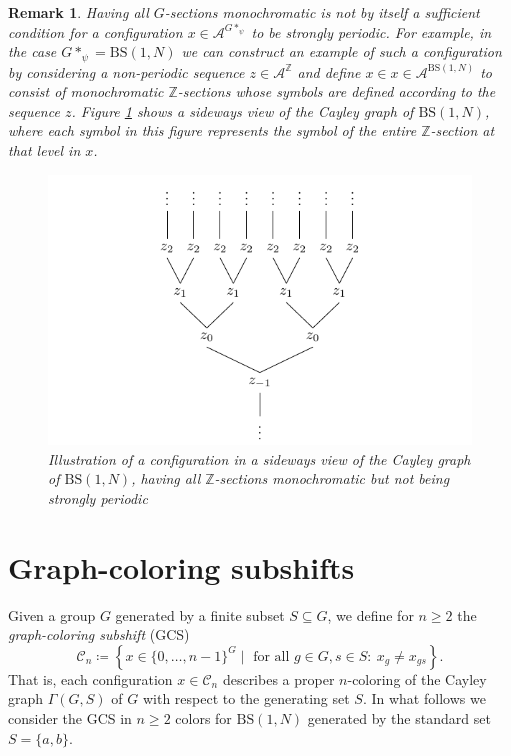\documentclass[cupthm,crop,info]{CUP-JNL-ETS}%
\theoremstyle{cupplain}
\theoremstyle{cupdefinition}
\theoremstyle{cupremark}
\newtheorem{remark}[theorem]{Remark}
\theoremstyle{cupproof}
\numberwithin{equation}{section}
\newcommand{\BS}[1][N]{\mathrm{BS}(1,#1)}
\begin{document}
\begin{remark} Having all $G$-sections monochromatic is not by itself a sufficient condition for a configuration $x\in \mathcal{A}^{G*_{\psi}}$ to be strongly periodic. For example, in the case $G*_{\psi}=\BS$ we can construct an example of such a configuration by considering a non-periodic sequence $z\in \mathcal{A}^\mathbb{Z}$ and define $x\in x\in \mathcal{A}^{\BS}$ to consist of monochromatic $\mathbb{Z}$-sections whose symbols are defined according to the sequence $z$. Figure \ref{fig:monochromatic_rows_tree_counterexample} shows a sideways view of the Cayley graph of $\BS$, where each symbol in this figure represents the symbol of the entire $\mathbb{Z}$-section at that level in $x$.
	\begin{figure}
		\centering
\includegraphics{tree_aperiodic.pdf}
		\caption{Illustration of a configuration in a sideways view of the Cayley graph of $\BS$, having all $\mathbb{Z}$-sections monochromatic but not being strongly periodic}
		\label{fig:monochromatic_rows_tree_counterexample}
	\end{figure}
\end{remark}



\section{Graph-coloring subshifts}\label{section:graph_coloring_subshifts}
Given a group $G$ generated by a finite subset $S\subseteq G$, we define for $n\ge 2$ the \textit{graph-coloring subshift} (GCS)
$$
\mathcal{C}_{n}\coloneqq\left\{x\in \{0,\ldots,n-1\}^G\mid \text{ for all } g\in G, s\in S: \ x_{g}\neq x_{gs} \right\}.
$$
That is, each configuration $x\in \mathcal{C}_{n}$ describes a proper $n$-coloring of the Cayley graph $\Gamma(G,S)$ of $G$ with respect to the generating set $S$. In what follows we consider the GCS in $n\ge 2$ colors for $\BS$ generated by the standard set $S=\{a,b\}$.
\end{document}
